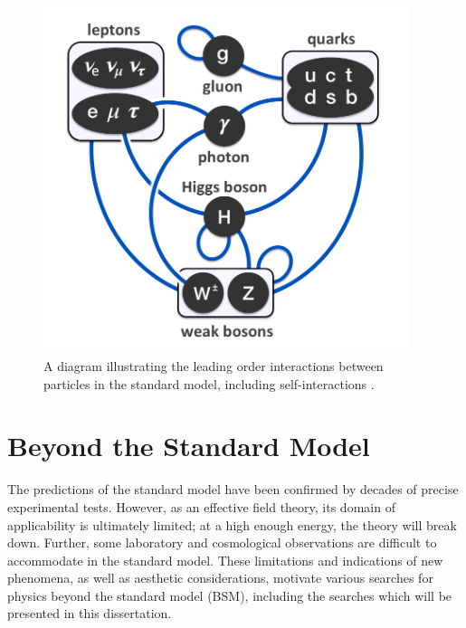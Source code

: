 \documentclass[12pt]{thesis}  %
\begin{document}
\begin{figure}[hbt]
\begin{center}
\includegraphics[width=0.95\textwidth]{figures/Elementary_particle_interactions_in_the_Standard_Model.png}
\caption{A diagram illustrating the leading order interactions between particles in the standard model, including self-interactions \cite{Drexler}.}
\label{fig:sm-interactions}
\end{center}
\end{figure}

\section{Beyond the Standard Model}

The predictions of the standard model have been confirmed by decades of precise experimental tests. However, as an effective field theory, its domain of applicability is ultimately limited; at a high enough energy, the theory will break down. Further, some laboratory and cosmological observations are difficult to accommodate in the standard model. These limitations and indications of new phenomena, as well as aesthetic considerations, motivate various searches for physics beyond the standard model (BSM), including the searches which will be presented in this dissertation.
\end{document}
